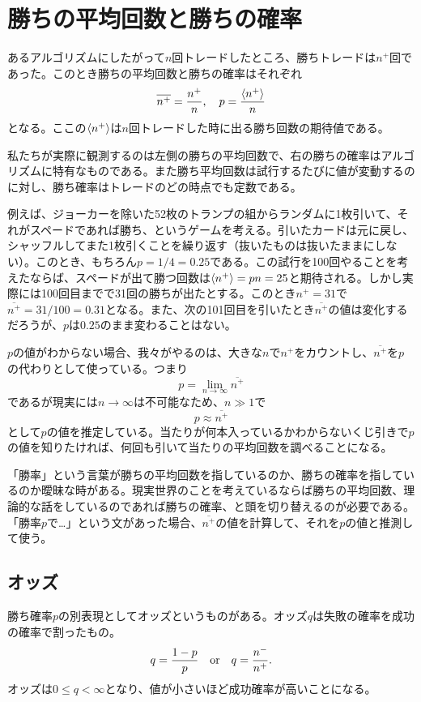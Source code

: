\documentclass[twoside,openright,a4paper,papersize,uplatex,dvipdfmx]{jsarticle}
\begin{document}
  \section{勝ちの平均回数と勝ちの確率} \label{sec: 勝ちの平均回数と勝ちの確率}

  あるアルゴリズムにしたがって$n$回トレードしたところ、勝ちトレードは$n^{+}$回であった。このとき勝ちの平均回数と勝ちの確率はそれぞれ
  \[
    \overline{ n^{+} } = \frac{ n^{+} }{ n }
      \qcomma
    p = \frac{ \expval{ n^{+} } }{ n }
  \]
  となる。ここの$ \expval{ n^{+} } $は$ n $回トレードした時に出る勝ち回数の期待値である。

  私たちが実際に観測するのは左側の勝ちの平均回数で、右の勝ちの確率はアルゴリズムに特有なものである。また勝ち平均回数は試行するたびに値が変動するのに対し、勝ち確率はトレードのどの時点でも定数である。

  例えば、ジョーカーを除いた52枚のトランプの組からランダムに1枚引いて、それがスペードであれば勝ち、というゲームを考える。引いたカードは元に戻し、シャッフルしてまた1枚引くことを繰り返す（抜いたものは抜いたままにしない）。このとき、もちろん$p = 1 / 4 = 0.25$である。この試行を100回やることを考えたならば、スペードが出て勝つ回数は$\expval{ n^{+} } = p n = 25$と期待される。しかし実際には100回目までで31回の勝ちが出たとする。このとき$n^{+} = 31$で$\overline{ n^{+} } = 31 / 100 = 0.31$となる。また、次の101回目を引いたとき$\overline{ n^{+} }$の値は変化するだろうが、$p$は$0.25$のまま変わることはない。

  $p$の値がわからない場合、我々がやるのは、大きな$n$で$n^{+}$をカウントし、$\overline{ n^{+} }$を$p$の代わりとして使っている。つまり
  \[
    p = \lim_{n \to \infty} \overline{ n^{+} }
  \]
  であるが現実には$n \to \infty$は不可能なため、$n \gg 1$で
  \[
    p \approx \overline{ n^{+} }
  \]
  として$p$の値を推定している。当たりが何本入っているかわからないくじ引きで$p$の値を知りたければ、何回も引いて当たりの平均回数を調べることになる。

  「勝率」という言葉が勝ちの平均回数を指しているのか、勝ちの確率を指しているのか曖昧な時がある。現実世界のことを考えているならば勝ちの平均回数、理論的な話をしているのであれば勝ちの確率、と頭を切り替えるのが必要である。「勝率$p$で…」という文があった場合、$\overline{ n^{+} }$の値を計算して、それを$p$の値と推測して使う。

  \subsection{オッズ} \label{subsec: オッズ}
  勝ち確率$p$の別表現としてオッズというものがある。オッズ$q$は失敗の確率を成功の確率で割ったもの。
  \[
    q = \frac{ 1 - p}{ p }
      \qq{or}
    q = \frac{ n^{-} }{ n^{+} }.
  \]
  オッズは$0 \le q < \infty$となり、値が小さいほど成功確率が高いことになる。
\end{document}
